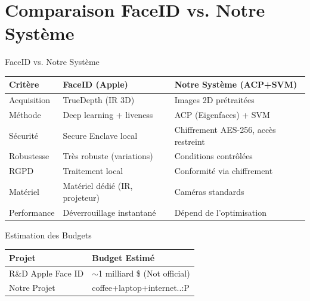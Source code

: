 \documentclass{beamer}
\begin{document}
\section{Comparaison FaceID vs. Notre Système}
\begin{frame}{FaceID vs. Notre Système}
\begin{center}
\begin{tabular}{|p{3cm}|p{4cm}|p{4cm}|}
\hline
\textbf{Critère} & \textbf{FaceID (Apple)} & \textbf{Notre Système (ACP+SVM)} \\
\hline
Acquisition & TrueDepth (IR 3D) & Images 2D prétraitées \\
\hline
Méthode & Deep learning + liveness & ACP (Eigenfaces) + SVM \\
\hline
Sécurité & Secure Enclave local & Chiffrement AES-256, accès restreint \\
\hline
Robustesse & Très robuste (variations) & Conditions contrôlées \\
\hline
RGPD & Traitement local & Conformité via chiffrement \\
\hline
Matériel & Matériel dédié (IR, projeteur) & Caméras standards \\
\hline
Performance & Déverrouillage instantané & Dépend de l'optimisation \\
\hline
\end{tabular}
\end{center}
\end{frame}

\begin{frame}{Estimation des Budgets}
    \begin{center}
    \begin{tabular}{|l|l|}
        \hline
        \textbf{Projet} & \textbf{Budget Estimé} \\
        \hline
        R\&D Apple Face ID & $\sim$1 milliard \$ (Not official) \\
        \hline
        Notre Projet & coffee+laptop+internet..:P \\
        \hline
    \end{tabular}
    \end{center}
    \vspace{0.5cm}
\end{frame}
\end{document}
